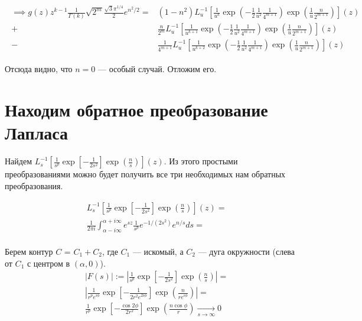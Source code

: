 \documentclass[a4paper, fleqn]{report}
\begin{document}
\begin{align*}
\begin{split}
    \implies g(z) z^{k-1} \frac{1}{\Gamma(k)} \sqrt{2^m} \frac{\sqrt{3} \pi^{1 /4}}{2} e^{n^2 /2} ={}& (1-n^2) L^{-1}_u \left[ \frac{1}{u^k} \exp \left( -\frac{1}{2} \frac{1}{u^2} \frac{1}{4^{m+1}} \right) \exp \left( \frac{1}{u} \frac{n}{2^{m+1}} \right)  \right](z) \\
    +{}& \frac{n}{2^m} L^{-1}_u \left[ \frac{1}{u^{k+1}} \exp \left( -\frac{1}{2} \frac{1}{u^2} \frac{1}{4^{m+1}} \right) \exp \left( \frac{1}{u} \frac{n}{2^{m+1}} \right)   \right](z) \\ 
    -{}& \frac{1}{4^{m+1}} L^{-1}_u \left[ \frac{1}{u^{k+2}} \exp \left( -\frac{1}{2} \frac{1}{u^2} \frac{1}{4^{m+1}} \right) \exp \left( \frac{1}{u} \frac{n}{2^{m+1}} \right)   \right](z) 
\end{split}
\end{align*}

Отсюда видно, что $n = 0$ --- особый случай. Отложим его.

\section{Находим обратное преобразование Лапласа}
Найдем $L^{-1}_s \left[ \frac{1}{s^p} \exp \left[ -\frac{1}{2 s^2} \right] \exp \left( \frac{n}{s} \right)  \right](z)$. Из этого простыми преобразованиями можно будет получить все три необходимых нам обратных преобразования.

\begin{align*}
    & L^{-1}_s \left[ \frac{1}{s^p} \exp \left[ -\frac{1}{2 s^2} \right] \exp \left( \frac{n}{s} \right)  \right](z) = \\
    & \frac{1}{2\pi i} \int_{\alpha - i \infty}^{\alpha+i\infty} e^{sz} \frac{1}{s^p} e^{-1/(2s^2)} e^{n/s} ds = \\
\end{align*}

Берем контур $C$ = $C_1 + C_2$, где $C_1$ --- искомый, а $C_2$ --- дуга окружности (слева от $C_1$ с центром в $(\alpha, 0)$).
\begin{align*}
    & \left|F(s)\right| := \left|\frac{1}{s^p} \exp \left[ -\frac{1}{2 s^2} \right] \exp \left( \frac{n}{s} \right)\right| = \\
    & \left|\frac{1}{r^p e^{i\phi}} \exp\left[ -\frac{1}{2 r^2 e^{2i\phi}} \right] \exp \left( \frac{n}{r e^{i\phi}} \right)\right| = \\
    & \frac{1}{r^p} \exp\left[ -\frac{\cos 2\phi}{2 r^2} \right] \exp \left( \frac{n \cos\phi}{r} \right) \xrightarrow[s \to \infty]{} 0 
\end{align*}
\end{document}
